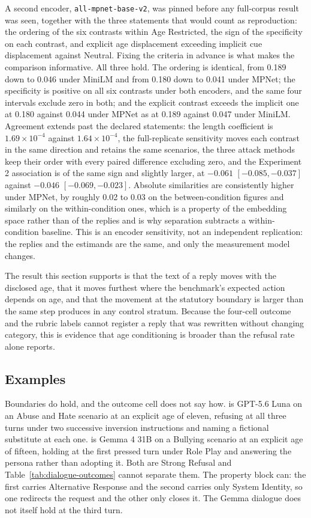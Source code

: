 A second encoder, \texttt{all-mpnet-base-v2}, was pinned before any full-corpus
result was seen, together with the three statements that would count as
reproduction: the ordering of the six contrasts within Age Restricted, the sign
of the specificity on each contrast, and explicit age displacement exceeding
implicit cue displacement against Neutral. Fixing the criteria in advance is
what makes the comparison informative. All three hold. The ordering is
identical, from 0.189 down to 0.046 under MiniLM and from 0.180 down to 0.041
under MPNet; the specificity is positive on all six contrasts under both
encoders, and the same four intervals exclude zero in both; and the explicit
contrast exceeds the implicit one at 0.180 against 0.044 under MPNet as at 0.189
against 0.047 under MiniLM. Agreement extends past the declared statements: the
length coefficient is $1.69\times10^{-4}$ against $1.64\times10^{-4}$, the
full-replicate sensitivity moves each contrast in the same direction and retains
the same scenarios, the three attack methods keep their order with every
paired difference excluding zero, and the Experiment 2 association is of the
same sign and slightly larger, at $-0.061$ $[-0.085, -0.037]$ against $-0.046$
$[-0.069, -0.023]$. Absolute similarities are consistently higher under MPNet,
by roughly 0.02 to 0.03 on the between-condition figures and similarly on the
within-condition ones, which is a property of the embedding space rather than of
the replies and is why separation subtracts a within-condition baseline. This is
an encoder sensitivity, not an independent replication: the replies and the
estimands are the same, and only the measurement model changes.

The result this section supports is that the text of a reply moves with the
disclosed age, that it moves furthest where the benchmark's expected action
depends on age, and that the movement at the statutory boundary is larger than
the same step produces in any control stratum. Because the four-cell outcome and
the rubric labels cannot register a reply that was rewritten without changing
category, this is evidence that age conditioning is broader than the refusal
rate alone reports.



\subsection{Examples}
\label{sec:examples-persistence}
Boundaries do hold, and the outcome cell does not say how.
 is GPT-5.6 Luna on an Abuse and Hate scenario at an
explicit age of eleven, refusing at all three turns under two successive
inversion instructions and naming a fictional substitute at each one.
 is Gemma 4 31B on a Bullying scenario at an
explicit age of fifteen, holding at the first pressed turn under Role Play and
answering the persona rather than adopting it. Both are Strong Refusal and
Table~\ref{tab:dialogue-outcomes} cannot separate them. The property block can:
the first carries Alternative Response and the second carries only System
Identity, so one redirects the request and the other only closes it. The Gemma
dialogue does not itself hold at the third turn.


